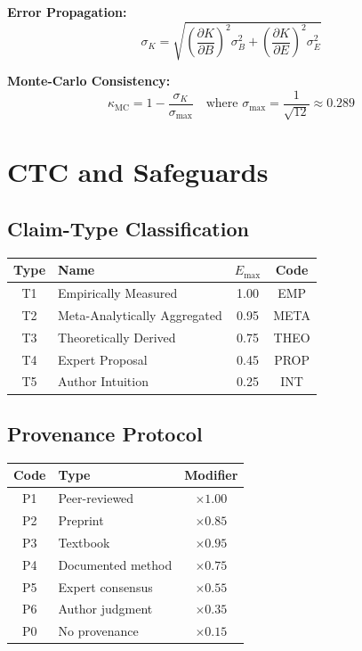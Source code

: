 \documentclass[11pt,a4paper]{article}
\begin{document}
\textbf{Error Propagation:}
\begin{equation}
\sigma_K = \sqrt{\left(\frac{\partial K}{\partial B}\right)^2 \sigma_B^2 + \left(\frac{\partial K}{\partial E}\right)^2 \sigma_E^2}
\end{equation}

\textbf{Monte-Carlo Consistency:}
\begin{equation}
\kappa_{\text{MC}} = 1 - \frac{\sigma_K}{\sigma_{\max}} \quad \text{where } \sigma_{\max} = \frac{1}{\sqrt{12}} \approx 0.289
\end{equation}

\newpage
\section{CTC and Safeguards}

\subsection{Claim-Type Classification}

\begin{center}
\begin{tabular}{clcc}
\toprule
\textbf{Type} & \textbf{Name} & \textbf{$E_{\max}$} & \textbf{Code} \\
\midrule
T1 & Empirically Measured & 1.00 & EMP \\
T2 & Meta-Analytically Aggregated & 0.95 & META \\
T3 & Theoretically Derived & 0.75 & THEO \\
T4 & Expert Proposal & 0.45 & PROP \\
T5 & Author Intuition & 0.25 & INT \\
\bottomrule
\end{tabular}
\end{center}

\subsection{Provenance Protocol}

\begin{center}
\begin{tabular}{clc}
\toprule
\textbf{Code} & \textbf{Type} & \textbf{Modifier} \\
\midrule
P1 & Peer-reviewed & $\times 1.00$ \\
P2 & Preprint & $\times 0.85$ \\
P3 & Textbook & $\times 0.95$ \\
P4 & Documented method & $\times 0.75$ \\
P5 & Expert consensus & $\times 0.55$ \\
P6 & Author judgment & $\times 0.35$ \\
P0 & No provenance & $\times 0.15$ \\
\bottomrule
\end{tabular}
\end{center}
\end{document}
